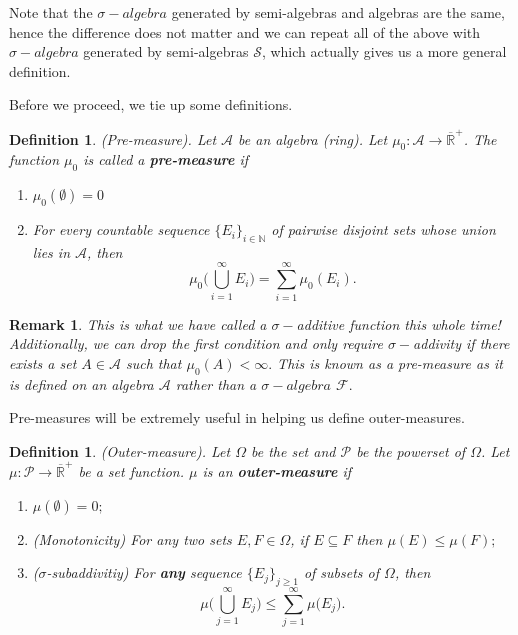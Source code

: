 \documentclass[twoside]{article}
\newtheorem{definition}[theorem]{Definition}
\newtheorem{remark}[theorem]{Remark}
\newcommand{\algebra}{\mathcal{A}}
\newcommand{\semialgebra}{\mathcal{S}}
\newcommand{\sigmalgebra}{\mathcal{F}}
\newcommand{\sa}{\sigma-algebra}
\newcommand{\powerset}{\mathcal{P}}
\newcommand{\positiveextendedreal}{\overline{\mathbb{R}}^+}
\begin{document}
Note that the $\sa$ generated by semi-algebras and algebras are the same, hence the difference does not matter and we can repeat all of the above with $\sa$ generated by semi-algebras $\semialgebra$, which actually gives us a more general definition.

Before we proceed, we tie up some definitions.

\begin{definition}(Pre-measure). Let $\algebra$ be an algebra (ring). Let $\mu_0: \algebra \rightarrow \positiveextendedreal$. The function $\mu_0$ is called a \textbf{pre-measure} if 
\begin{enumerate}
\item $\mu_0(\emptyset) = 0$
\item For every countable sequence $\{E_i\}_{i \in \mathbb{N}}$ of pairwise disjoint sets whose union lies in $\algebra$, then 
$$
\mu_0\bigg(\bigcup_{i=1}^{\infty}E_i \bigg) = \sum_{i=1}^{\infty}\mu_0(E_i).
$$
\end{enumerate}
\end{definition}

\begin{remark}This is what we have called a $\sigma-$additive function this whole time! Additionally, we can drop the first condition and only require $\sigma-$addivity if there exists a set $A \in \algebra$ such that $\mu_0(A) < \infty.$ This is known as a pre-measure as it is defined on an algebra $\algebra$ rather than a $\sa$ $\sigmalgebra.$
\end{remark}

Pre-measures will be extremely useful in helping us define outer-measures.

\begin{definition}(Outer-measure). Let $\Omega$ be the set and $\powerset$ be the powerset of $\Omega$. Let $\mu: \powerset \rightarrow \positiveextendedreal$ be a set function. $\mu$ is an \textbf{outer-measure} if 
\begin{enumerate}
\item $\mu(\emptyset) = 0;$
\item (Monotonicity) For any two sets $E, F \in \Omega$, if $E \subseteq F$ then $\mu(E) \leq \mu(F);$
\item ($\sigma$-subaddivitiy) For \textbf{any} sequence $\{E_j\}_{j \geq 1}$ of subsets of $\Omega$, then 
$$
\mu\bigg(\bigcup_{j=1}^{\infty}E_j \bigg) \leq \sum_{j=1}^{\infty}\mu\bigg(E_j \bigg).
$$
\end{enumerate}
\end{definition}
\end{document}
